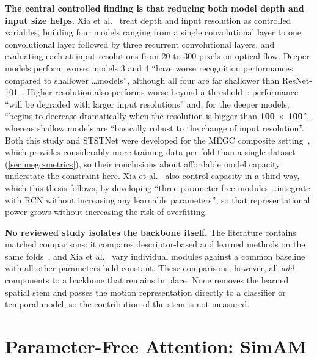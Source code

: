 \textbf{The central controlled finding is that reducing both model depth and input size helps.} Xia et al.~\cite{xia2020b} treat depth and input resolution as controlled variables, building four models ranging from a single convolutional layer to one convolutional layer followed by three recurrent convolutional layers, and evaluating each at input resolutions from 20 to 300 pixels on optical flow. Deeper models perform worse: models 3 and 4 ``have worse recognition performances compared to shallower \ldots models'', although all four are far shallower than ResNet-101~\cite{he2016}. Higher resolution also performs worse beyond a threshold~\cite{xia2020b}: performance ``will be degraded with larger input resolutions'' and, for the deeper models, ``begins to decrease dramatically when the resolution is bigger than \textbf{100 $\times$ 100}'', whereas shallow models are ``basically robust to the change of input resolution''. Both this study and STSTNet were developed for the MEGC composite setting~\cite{xia2020b,liong2019b,see2019}, which provides considerably more training data per fold than a single dataset (\autoref{sec:megc-metrics}), so their conclusions about affordable model capacity understate the constraint here. Xia et al.~\cite{xia2020b} also control capacity in a third way, which this thesis follows, by developing ``three parameter-free modules \ldots integrate with RCN without increasing any learnable parameters'', so that representational power grows without increasing the risk of overfitting.

\textbf{No reviewed study isolates the backbone itself.} The literature contains matched comparisons: it compares descriptor-based and learned methods on the same folds~\cite{liong2019b,see2019}, and Xia et al.~\cite{xia2020b} vary individual modules against a common baseline with all other parameters held constant. These comparisons, however, all \textit{add} components to a backbone that remains in place. None removes the learned spatial stem and passes the motion representation directly to a classifier or temporal model, so the contribution of the stem is not measured.


\section{Parameter-Free Attention: SimAM}
\label{sec:simam-review}

